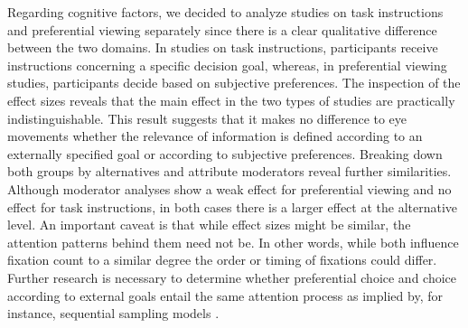 \documentclass[english,natbib,man,floatsintext]{apa6}
\begin{document}
Regarding cognitive factors, we decided to analyze studies on task instructions and preferential viewing separately since there is a clear qualitative difference between the two domains. In studies on task instructions, participants receive instructions concerning a specific decision goal, whereas, in preferential viewing studies, participants decide based on subjective preferences. The inspection of the effect sizes reveals that the main effect in the two types of studies are practically indistinguishable. This result suggests that it makes no difference to eye movements whether the relevance of information is defined according to an externally specified goal or according to subjective preferences. Breaking down both groups by alternatives and attribute moderators reveal further similarities. Although moderator analyses show a weak effect for preferential viewing and no effect for task instructions, in both cases there is a larger effect at the alternative level. An important caveat is that while effect sizes might be similar, the attention patterns behind them need not be. In other words, while both influence fixation count to a similar degree the order or timing of fixations could differ. Further research is necessary to determine whether preferential choice and choice according to external goals entail the same attention process as implied by, for instance, sequential sampling models \citep{forstmann2016}.\\ 
\end{document}
